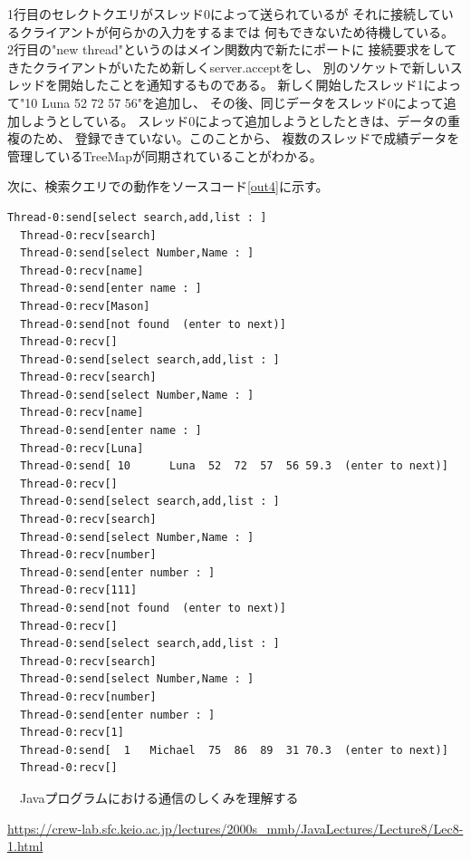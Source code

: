 \documentclass[dvipdfmx]{jsarticle}
\begin{document}
1行目のセレクトクエリがスレッド0によって送られているが
それに接続しているクライアントが何らかの入力をするまでは
何もできないため待機している。
2行目の"new thread"というのはメイン関数内で新たにポートに
接続要求をしてきたクライアントがいたため新しくserver.acceptをし、
別のソケットで新しいスレッドを開始したことを通知するものである。
新しく開始したスレッド1によって"10 Luna 52 72 57 56"を追加し、
その後、同じデータをスレッド0によって追加しようとしている。
スレッド0によって追加しようとしたときは、データの重複のため、
登録できていない。このことから、
複数のスレッドで成績データを管理しているTreeMapが同期されていることがわかる。

次に、検索クエリでの動作をソースコード\ref{out4}に示す。
\begin{lstlisting}[caption=検索クエリ,label=out4]
  Thread-0:send[select search,add,list : ]
  Thread-0:recv[search]
  Thread-0:send[select Number,Name : ]
  Thread-0:recv[name]
  Thread-0:send[enter name : ]
  Thread-0:recv[Mason]
  Thread-0:send[not found  (enter to next)]
  Thread-0:recv[]
  Thread-0:send[select search,add,list : ]
  Thread-0:recv[search]
  Thread-0:send[select Number,Name : ]
  Thread-0:recv[name]
  Thread-0:send[enter name : ]
  Thread-0:recv[Luna]
  Thread-0:send[ 10      Luna  52  72  57  56 59.3  (enter to next)]
  Thread-0:recv[]
  Thread-0:send[select search,add,list : ]
  Thread-0:recv[search]
  Thread-0:send[select Number,Name : ]
  Thread-0:recv[number]
  Thread-0:send[enter number : ]
  Thread-0:recv[111]
  Thread-0:send[not found  (enter to next)]
  Thread-0:recv[]
  Thread-0:send[select search,add,list : ]
  Thread-0:recv[search]
  Thread-0:send[select Number,Name : ]
  Thread-0:recv[number]
  Thread-0:send[enter number : ]
  Thread-0:recv[1]
  Thread-0:send[  1   Michael  75  86  89  31 70.3  (enter to next)]
  Thread-0:recv[]  
\end{lstlisting}



\begin{thebibliography}{10}
  　Javaプログラムにおける通信のしくみを理解する

  \url{https://crew-lab.sfc.keio.ac.jp/lectures/2000s_mmb/JavaLectures/Lecture8/Lec8-1.html}
\end{thebibliography}
\end{document}
